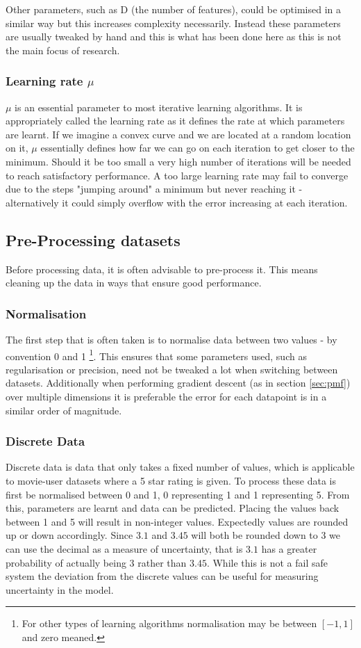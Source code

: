 Other parameters, such as D (the number of features), could be optimised in a similar way but this increases complexity necessarily. Instead these parameters are usually tweaked by hand and this is what has been done here as this is not the main focus of research.
\subsubsection{Learning rate $\mu$}

$\mu$ is an essential parameter to most iterative learning algorithms. It is appropriately called the learning rate as it defines the rate at which parameters are learnt. If we imagine a convex curve and we are located at a random location on it, $\mu$ essentially defines how far we can go on each iteration to get closer to the minimum. Should it be too small a very high number of iterations will be needed to reach satisfactory performance. A too large learning rate may fail to converge due to the steps "jumping around" a minimum but never reaching it - alternatively it could simply overflow with the error increasing at each iteration.

\subsection{Pre-Processing datasets}
Before processing data, it is often advisable to pre-process it. This means cleaning up the data in ways that ensure good performance.
\subsubsection{Normalisation}
The first step that is often taken is to normalise data between two values - by convention 0 and 1 \footnote{For other types of learning algorithms normalisation may be between $[-1,1]$ and zero meaned.}. This ensures that some parameters used, such as regularisation or precision, need not be tweaked a lot when switching between datasets. Additionally when performing gradient descent (as in section \ref{sec:pmf}) over multiple dimensions it is preferable the error for each datapoint is in a similar order of magnitude.
\subsubsection{Discrete Data}
Discrete data is data that only takes a fixed number of values, which is applicable to movie-user datasets where a 5 star rating is given. To process these data is first be normalised between 0 and 1, 0 representing 1 and 1 representing 5. From this, parameters are learnt and data can be predicted. Placing the values back between 1 and 5 will result in non-integer values. Expectedly values are rounded up or down accordingly. Since $3.1$ and $3.45$ will both be rounded down to $3$ we can use the decimal as a measure of uncertainty, that is $3.1$ has a greater probability of actually being $3$ rather than $3.45$. While this is not a fail safe system the deviation from the discrete values can be useful for measuring uncertainty in the model.
